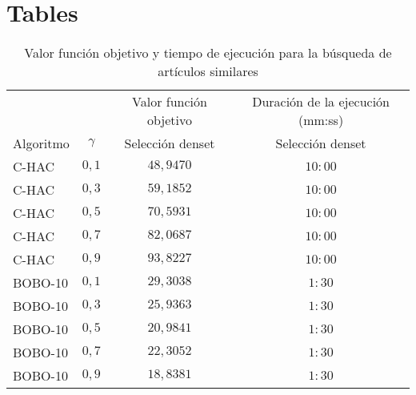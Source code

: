 \appendix
\section{Tables}\label{appendix-tables}
\begin{table}[H]
	\centering
	\resizebox{\textwidth}{!} {
		\begin{tabular}{|lc|cc|}
			\hline
			~  & ~ & Valor función objetivo & Duración de la 
				ejecución (mm:ss) \\
			Algoritmo & $\gamma$ & Selección denset &  Selección denset \\ 
			\hline
			C-HAC & $0,1$ & $48,9470$  & $10:00$ \\
			C-HAC & $0,3$ & $59,1852$  & $10:00$ \\
			C-HAC & $0,5$ & $70,5931$  & $10:00$ \\
			C-HAC & $0,7$ & $82,0687$  & $10:00$ \\
			C-HAC & $0,9$ & $93,8227$  & $10:00$ \\
			BOBO-10 & $0,1$ & $29,3038$  & $1:30$ \\
			BOBO-10 & $0,3$ & $25,9363$  & $1:30$ \\
			BOBO-10 & $0,5$ & $20,9841$  & $1:30$ \\
			BOBO-10 & $0,7$ & $22,3052$  & $1:30$ \\
			BOBO-10 & $0,9$ & $18,8381$  & $1:30$ \\
			\hline
		\end{tabular}
	}
	\caption {Valor función objetivo y tiempo de ejecución para la búsqueda de artículos similares}
\end{table}


